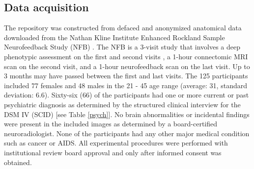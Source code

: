 \subsection*{Data acquisition}

\par The repository was constructed from defaced and anonymized anatomical data downloaded from the Nathan Kline Institute Enhanced Rockland Sample Neurofeedback Study (NFB) \cite{Nooner2012}. The NFB is a 3-visit study that involves a deep phenotypic assessment on the first and second visits \cite{Nooner2012}, a 1-hour connectomic MRI scan on the second visit, and a 1-hour neurofeedback scan on the last visit. Up to 3 months may have passed between the first and last visits. The 125 participants included 77 females and 48 males in the 21 - 45 age range (average: 31, standard deviation: 6.6). Sixty-six (66) of the participants had one or more current or past psychiatric diagnosis as determined by the structured clinical interview for the DSM IV (SCID) \cite{skid} [see Table \ref{psych}]. No brain abnormalities or incidental findings were present in the included images as determined by a board-certified neuroradiologist. None of the participants had any other major medical condition such as cancer or AIDS. All experimental procedures were performed with institutional review board approval and only after informed consent was obtained.

